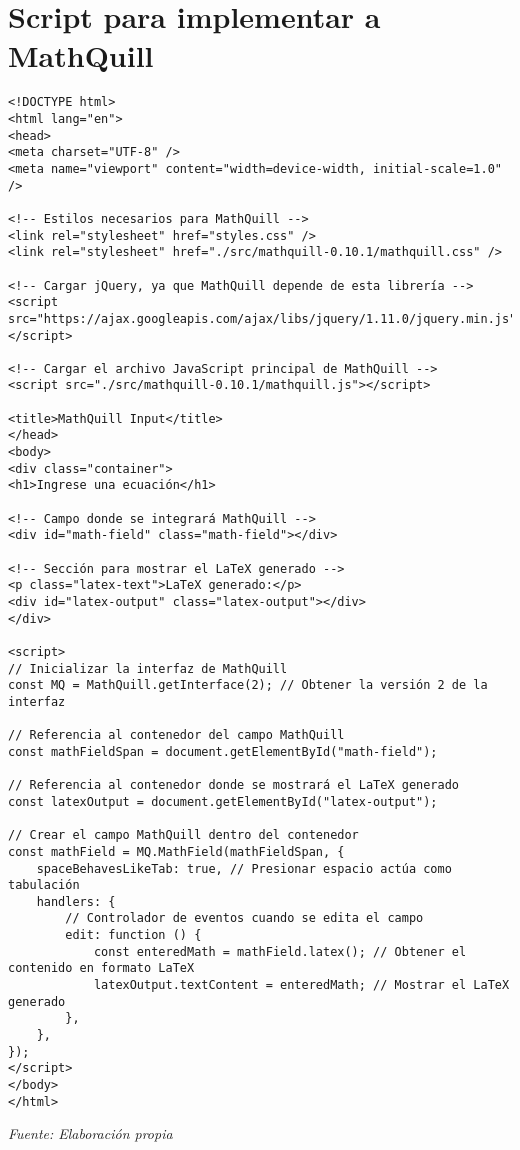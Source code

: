 \section{Script para implementar a MathQuill} \label{app3:mathquill}
\begin{longlisting}
	\begin{verbatim}
<!DOCTYPE html>
<html lang="en">
<head>
<meta charset="UTF-8" />
<meta name="viewport" content="width=device-width, initial-scale=1.0" />

<!-- Estilos necesarios para MathQuill -->
<link rel="stylesheet" href="styles.css" />
<link rel="stylesheet" href="./src/mathquill-0.10.1/mathquill.css" />

<!-- Cargar jQuery, ya que MathQuill depende de esta librería -->
<script src="https://ajax.googleapis.com/ajax/libs/jquery/1.11.0/jquery.min.js"></script>

<!-- Cargar el archivo JavaScript principal de MathQuill -->
<script src="./src/mathquill-0.10.1/mathquill.js"></script>

<title>MathQuill Input</title>
</head>
<body>
<div class="container">
<h1>Ingrese una ecuación</h1>

<!-- Campo donde se integrará MathQuill -->
<div id="math-field" class="math-field"></div>

<!-- Sección para mostrar el LaTeX generado -->
<p class="latex-text">LaTeX generado:</p>
<div id="latex-output" class="latex-output"></div>
</div>

<script>
// Inicializar la interfaz de MathQuill
const MQ = MathQuill.getInterface(2); // Obtener la versión 2 de la interfaz

// Referencia al contenedor del campo MathQuill
const mathFieldSpan = document.getElementById("math-field");

// Referencia al contenedor donde se mostrará el LaTeX generado
const latexOutput = document.getElementById("latex-output");

// Crear el campo MathQuill dentro del contenedor
const mathField = MQ.MathField(mathFieldSpan, {
	spaceBehavesLikeTab: true, // Presionar espacio actúa como tabulación
	handlers: {
		// Controlador de eventos cuando se edita el campo
		edit: function () {
			const enteredMath = mathField.latex(); // Obtener el contenido en formato LaTeX
			latexOutput.textContent = enteredMath; // Mostrar el LaTeX generado
		},
	},
});
</script>
</body>
</html>
	\end{verbatim}
\caption[Código para usar MathQuill para introducir datos en \TeX] {Código para usar MathQuill para introducir datos en \TeX}\textit{Fuente: Elaboración propia}
\end{longlisting}

